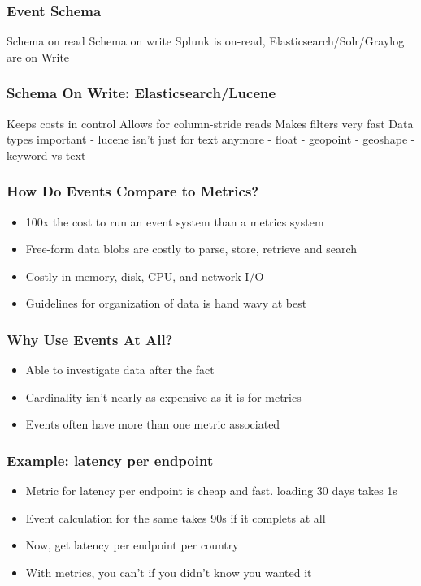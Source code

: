 \begin{frame}[fragile]
    \frametitle{Event Schema}

    Schema on read Schema on write
    Splunk is on-read, Elasticsearch/Solr/Graylog are on Write

\end{frame}

\begin{frame}[fragile]
    \frametitle{Schema On Write: Elasticsearch/Lucene}
    Keeps costs in control
    Allows for column-stride reads
    Makes filters very fast
    Data types important - lucene isn't just for text anymore
     - float
     - geopoint
     - geoshape
     - keyword vs text
\end{frame}

\begin{frame}
    \frametitle{How Do Events Compare to Metrics?}
    \begin{itemize}
      \item 100x the cost to run an event system than a metrics system
      \item Free-form data blobs are costly to parse, store, retrieve and search
      \item Costly in memory, disk, CPU, and network I/O
      \item Guidelines for organization of data is hand wavy at best
    \end{itemize}
\end{frame}

\begin{frame}
    \frametitle{Why Use Events At All?}
    \begin{itemize}
      \item Able to investigate data after the fact
      \item Cardinality isn't nearly as expensive as it is for metrics
      \item Events often have more than one metric associated
    \end{itemize}
\end{frame}

\begin{frame}
    \frametitle{Example: latency per endpoint}
    \begin{itemize}
      \item Metric for latency per endpoint is cheap and fast. loading 30 days takes 1s
      \item Event calculation for the same takes 90s if it complets at all
      \item Now, get latency per endpoint per country
      \item With metrics, you can't if you didn't know you wanted it
    \end{itemize}
\end{frame}



